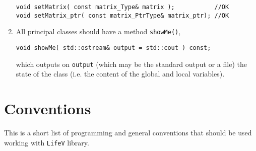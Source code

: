 \documentclass[a4paper]{article}
\begin{document}
\begin{enumerate}
\begin{lstlisting}
void setMatrix( const matrix_Type& matrix );           //OK
void setMatrix_ptr( const matrix_PtrType& matrix_ptr); //OK
\end{lstlisting}
  \item All principal classes should have a method \texttt{showMe()},
\begin{lstlisting}
void showMe( std::ostream& output = std::cout ) const;
\end{lstlisting}
  which outputs on \texttt{output} (which may be the standard output or a file) the state of the class (i.e.  the content of the global and local variables).
\end{enumerate}

\section{Conventions}
This is a short list of programming and general conventions that should be used working with \texttt{LifeV} library.
\end{document}
